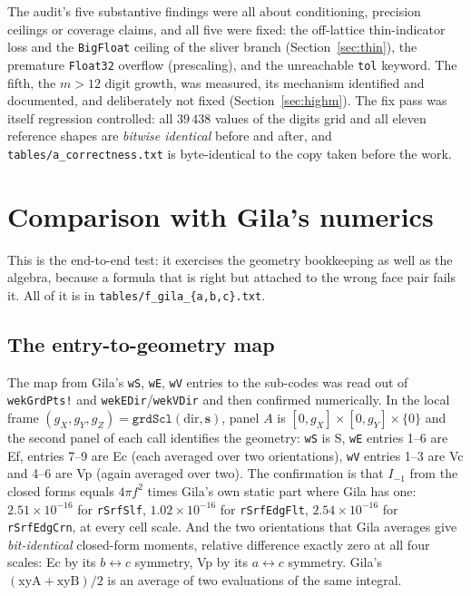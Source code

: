 \documentclass[11pt]{article}
\theoremstyle{remark}
\newcommand{\code}[1]{\texttt{#1}}
\begin{document}
The audit's five substantive findings were all about conditioning, precision ceilings or
coverage claims, and all five were fixed: the off-lattice thin-indicator loss and the
\code{BigFloat} ceiling of the sliver branch (Section~\ref{sec:thin}), the premature
\code{Float32} overflow (prescaling), and the unreachable \code{tol} keyword. The fifth,
the $m > 12$ digit growth, was measured, its mechanism identified and documented, and
deliberately not fixed (Section~\ref{sec:highm}). The fix pass was itself regression
controlled: all $39\,438$ values of the digits grid and all eleven reference shapes are
\emph{bitwise identical} before and after, and \code{tables/a\_correctness.txt} is
byte-identical to the copy taken before the work.

\section{Comparison with Gila's numerics}
\label{sec:gila}

This is the end-to-end test: it exercises the geometry bookkeeping as well as the algebra,
because a formula that is right but attached to the wrong face pair fails it. All of it is
in \code{tables/f\_gila\_\{a,b,c\}.txt}.

\subsection{The entry-to-geometry map}

The map from Gila's \code{wS}, \code{wE}, \code{wV} entries to the sub-codes was read out
of \code{wekGrdPts!} and \code{wekEDir}/\code{wekVDir} and then confirmed numerically. In
the local frame $(g_X,g_Y,g_Z) = \code{grdScl}(\mathrm{dir}, \mathbf{s})$, panel $A$ is
$[0,g_X]\times[0,g_Y]\times\{0\}$ and the second panel of each call identifies the
geometry: \code{wS} is S, \code{wE} entries 1--6 are Ef, entries 7--9 are Ec (each averaged
over two orientations), \code{wV} entries 1--3 are Vc and 4--6 are Vp (again averaged over
two). The confirmation is that $I_{-1}$ from the closed forms equals $4\pi f^2$ times
Gila's own static part where Gila has one: $2.51\times10^{-16}$ for \code{rSrfSlf},
$1.02\times10^{-16}$ for \code{rSrfEdgFlt}, $2.54\times10^{-16}$ for \code{rSrfEdgCrn},
at every cell scale. And the two orientations that Gila averages give
\emph{bit-identical} closed-form moments, relative difference exactly zero at all four
scales: Ec by its $b\leftrightarrow c$ symmetry, Vp by its $a\leftrightarrow c$ symmetry.
Gila's $(\mathrm{xyA}+\mathrm{xyB})/2$ is an average of two evaluations of the same
integral.
\end{document}
